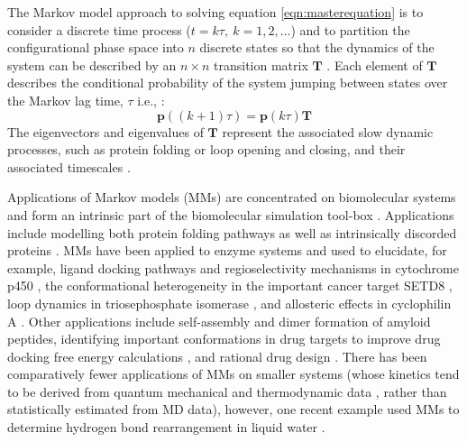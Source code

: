 The Markov model approach to solving equation \ref{eqn:masterequation} is to consider a discrete time process ($t = k\tau,\ k = 1, 2, \ldots$) and to partition the configurational phase space into $n$ discrete states so that  the dynamics of the system can be described by an $n\times n$ transition matrix $\mathbf{T}$ \cite{prinzMarkovModelsMolecular2011}. Each element of $\mathbf{T}$ describes the conditional probability of the system jumping between states over the Markov lag time, $\tau$ i.e., \cite{noeTransitionNetworksModeling2008}: 
\begin{equation}\label{eqn:discretemasterequation}
    \mathbf{p}((k+1)\tau) = \mathbf{p}(k\tau)\mathbf{T}
\end{equation}
The eigenvectors and eigenvalues of $\mathbf{T}$ represent the associated slow dynamic processes, such as protein folding or loop opening and closing, and their associated timescales \cite{prinzMarkovModelsMolecular2011}. 

Applications of Markov models (MMs) are concentrated on biomolecular systems and form an intrinsic part of the biomolecular simulation tool-box \cite{hugginsBiomolecularSimulationsDynamics2019}. Applications include modelling both protein folding pathways \cite{singhalUsingPathSampling2004,swopeDescribingProteinFolding2004} as well as intrinsically discorded proteins \cite{schorAnalyticalMethodsStructural2016a}. 
MMs have been applied to enzyme systems and used to elucidate, for example, ligand docking pathways \cite{ahalawatMappingSubstrateRecognition2018a} and regioselectivity mechanisms in cytochrome p450 \cite{dodaniDiscoveryRegioselectivitySwitch2016a}, the conformational heterogeneity in the important cancer target SETD8 \cite{chenDynamicConformationalLandscape2019a}, loop dynamics in triosephosphate isomerase \cite{LoopMotionTriosephosphate}, and allosteric effects in cyclophilin A \cite{wapeesittipanAllostericEffectsCyclophilin2019}. Other applications include self-assembly \cite{senguptaAutomatedMarkovState2019} and dimer formation \cite{leahyCoarseMasterEquations2016} of amyloid peptides, identifying important conformations in drug targets to improve drug docking free energy calculations \cite{amaroEnsembleDockingDrug2018}, and rational drug design \cite{gervasioBiomolecularSimulationsStructureBased2019}. There has been comparatively fewer applications of MMs on smaller systems (whose kinetics tend to be derived from quantum mechanical and thermodynamic data \cite{glowackiMESMEROpenSourceMaster2012, pillingMasterEquationModels2003}, rather than statistically estimated from MD data), however, one recent example used MMs to determine hydrogen bond rearrangement in liquid water \cite{schulzCollectiveHydrogenbondRearrangement2018}. 


